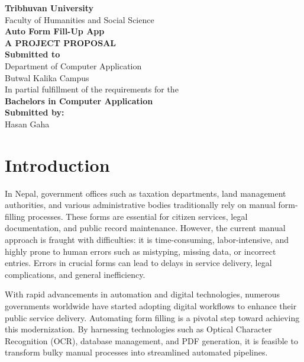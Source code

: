 \documentclass[12pt,a4paper]{report}
\newcommand{\frontmatter}{%
  \pagenumbering{roman}
}
\newcommand{\mainmatter}{%
  \cleardoublepage
  \pagenumbering{arabic}
}
\begin{document}
\thispagestyle{empty}
\begin{center}
    {\Large \textbf{Tribhuvan University}} \\[0.5cm]
    {\Large Faculty of Humanities and Social Science} \\[1.5cm]

    {\Huge \textbf{Auto Form Fill-Up App}} \\[0.5cm]
    {\LARGE \textbf{A PROJECT PROPOSAL}} \\[2cm]

    \textbf{Submitted to} \\[0.3cm]
    Department of Computer Application \\[0.3cm]
    Butwal Kalika Campus \\[1cm]

    In partial fulfillment of the requirements for the \\[0.3cm]
    \textbf{Bachelors in Computer Application} \\[2cm]

    \textbf{Submitted by:} \\[0.3cm]
    Hasan Gaha \\[2cm]

    
\end{center}
\newpage

\frontmatter
\tableofcontents

\mainmatter

\chapter{Introduction}
In Nepal, government offices such as taxation departments, land management authorities, and various administrative bodies traditionally rely on manual form-filling processes. These forms are essential for citizen services, legal documentation, and public record maintenance. However, the current manual approach is fraught with difficulties: it is time-consuming, labor-intensive, and highly prone to human errors such as mistyping, missing data, or incorrect entries. Errors in crucial forms can lead to delays in service delivery, legal complications, and general inefficiency.

With rapid advancements in automation and digital technologies, numerous governments worldwide have started adopting digital workflows to enhance their public service delivery. Automating form filling is a pivotal step toward achieving this modernization. By harnessing technologies such as Optical Character Recognition (OCR), database management, and PDF generation, it is feasible to transform bulky manual processes into streamlined automated pipelines.
\end{document}
